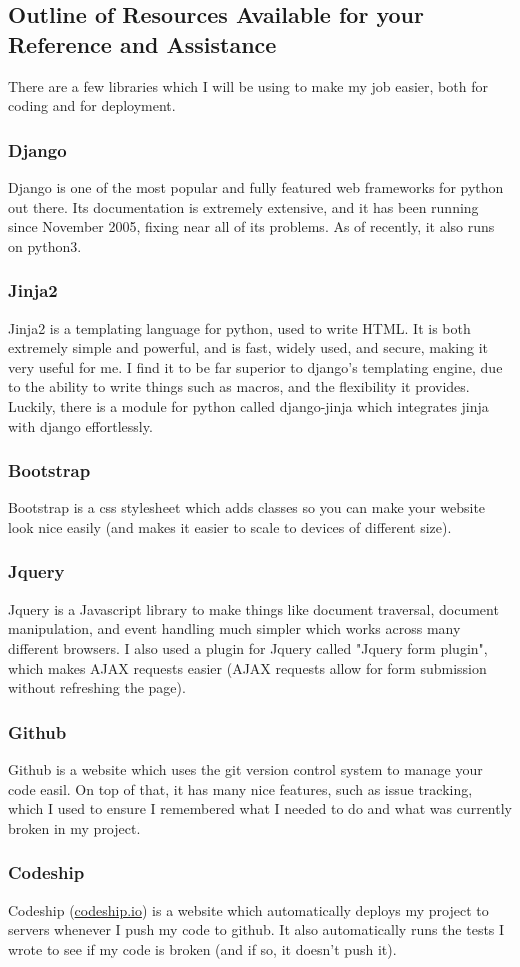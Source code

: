 \subsection{Outline of Resources Available for your Reference and Assistance}
There are a few libraries which I will be using to make my job easier, both for coding and for deployment.

\subsubsection{Django}
Django is one of the most popular and fully featured web frameworks for python out there. Its documentation is extremely extensive, and it has been running since November 2005, fixing near all of its problems. As of recently, it also runs on python3.

\subsubsection{Jinja2}
Jinja2 is a templating language for python, used to write HTML. It is both extremely simple and powerful, and is fast, widely used, and secure, making it very useful for me. I find it to be far superior to django's templating engine, due to the ability to write things such as macros, and the flexibility it provides. Luckily, there is a module for python called django-jinja which integrates jinja with django effortlessly.

\subsubsection{Bootstrap}
Bootstrap is a css stylesheet which adds classes so you can make your website look nice easily (and makes it easier to scale to devices of different size).

\subsubsection{Jquery}
Jquery is a Javascript library to make things like document traversal, document manipulation, and event handling much simpler which works across many different browsers. I also used a plugin for Jquery called "Jquery form plugin", which makes AJAX requests easier (AJAX requests allow for form submission without refreshing the page).

\subsubsection{Github}
Github is a website which uses the git version control system to manage your code easil. On top of that, it has many nice features, such as issue tracking, which I used to ensure I remembered what I needed to do and what was currently broken in my project.

\subsubsection{Codeship}
Codeship (\url{codeship.io}) is a website which automatically deploys my project to servers whenever I push my code to github. It also automatically runs the tests I wrote to see if my code is broken (and if so, it doesn't push it).